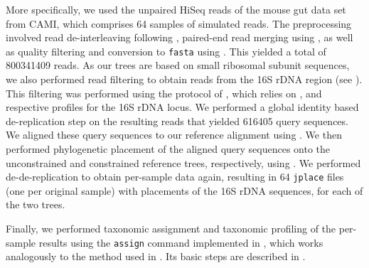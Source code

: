 More specifically, we used the unpaired HiSeq reads of the mouse gut data set from CAMI,
which comprises \num{64} samples of simulated reads.
The preprocessing involved read de-interleaving following \cite{DeinterleaveFastq},
paired-end read merging using  \citep{Zhang2014},
as well as quality filtering and conversion to \texttt{fasta} using  \citep{Rognes2016}.
This yielded a total of \num{800 341 409} reads.
As our trees are based on small ribosomal subunit sequences,
we also performed read filtering to obtain reads from the 16S rDNA region
(see ).
This filtering was performed using the protocol of \cite{Logares2014},
which relies on  \citep{Eddy1998,Eddy2009}, and respective profiles for the 16S rDNA locus.
We performed a global identity based de-replication step on the resulting reads that yielded \num{616 405} query sequences.
We aligned these query sequences to our  reference alignment
using  \citep{Berger2011a,Berger2012}.
We then performed phylogenetic placement of the aligned query sequences onto the unconstrained and constrained reference trees,
respectively, using  \citep{Barbera2018}.
We performed de-de-replication to obtain per-sample data again, %
resulting in \num{64} \texttt{jplace} files (one per original sample) with placements of the 16S rDNA sequences,
for each of the two trees.


Finally, we performed taxonomic assignment and taxonomic profiling of the per-sample results
using the \texttt{assign} command implemented in ,
which works analogously to the method used in  \citep{Kozlov2016}.
Its basic steps are described in .
